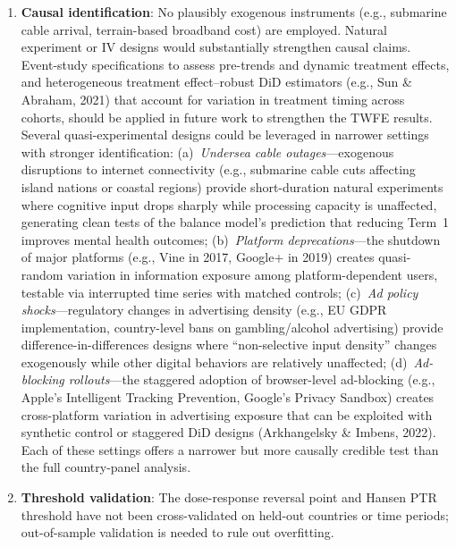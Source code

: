 \documentclass[a4paper,11pt,titlepage]{article}
\begin{document}
\begin{enumerate}
  \item \textbf{Causal identification}: No plausibly exogenous instruments (e.g., submarine cable arrival, terrain-based broadband cost) are employed. Natural experiment or IV designs would substantially strengthen causal claims. Event-study specifications to assess pre-trends and dynamic treatment effects, and heterogeneous treatment effect--robust DiD estimators (e.g., Sun \& Abraham, 2021) that account for variation in treatment timing across cohorts, should be applied in future work to strengthen the TWFE results. Several quasi-experimental designs could be leveraged in narrower settings with stronger identification: (a)~\textit{Undersea cable outages}---exogenous disruptions to internet connectivity (e.g., submarine cable cuts affecting island nations or coastal regions) provide short-duration natural experiments where cognitive input drops sharply while processing capacity is unaffected, generating clean tests of the balance model's prediction that reducing Term~1 improves mental health outcomes; (b)~\textit{Platform deprecations}---the shutdown of major platforms (e.g., Vine in 2017, Google+ in 2019) creates quasi-random variation in information exposure among platform-dependent users, testable via interrupted time series with matched controls; (c)~\textit{Ad policy shocks}---regulatory changes in advertising density (e.g., EU GDPR implementation, country-level bans on gambling/alcohol advertising) provide difference-in-differences designs where ``non-selective input density'' changes exogenously while other digital behaviors are relatively unaffected; (d)~\textit{Ad-blocking rollouts}---the staggered adoption of browser-level ad-blocking (e.g., Apple's Intelligent Tracking Prevention, Google's Privacy Sandbox) creates cross-platform variation in advertising exposure that can be exploited with synthetic control or staggered DiD designs (Arkhangelsky \& Imbens, 2022). Each of these settings offers a narrower but more causally credible test than the full country-panel analysis.
  \item \textbf{Threshold validation}: The dose-response reversal point and Hansen PTR threshold have not been cross-validated on held-out countries or time periods; out-of-sample validation is needed to rule out overfitting.

\end{enumerate}
\end{document}
